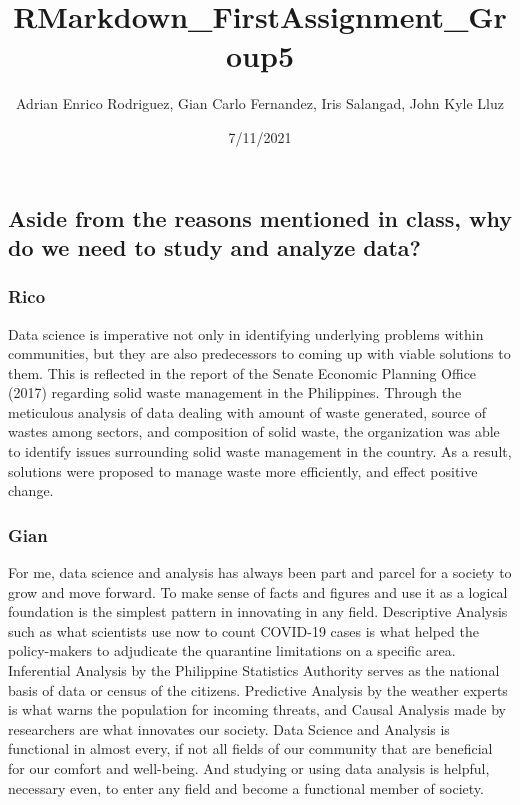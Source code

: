 \documentclass[
]{article}
\title{RMarkdown\_FirstAssignment\_Group5}
\author{Adrian Enrico Rodriguez, Gian Carlo Fernandez, Iris Salangad,
John Kyle Lluz}
\date{7/11/2021}
\begin{document}
\maketitle

\hypertarget{aside-from-the-reasons-mentioned-in-class-why-do-we-need-to-study-and-analyze-data}{%
\subsection{Aside from the reasons mentioned in class, why do we need to
study and analyze
data?}\label{aside-from-the-reasons-mentioned-in-class-why-do-we-need-to-study-and-analyze-data}}

\hypertarget{rico}{%
\subsubsection{Rico}\label{rico}}

Data science is imperative not only in identifying underlying problems
within communities, but they are also predecessors to coming up with
viable solutions to them. This is reflected in the report of the Senate
Economic Planning Office (2017) regarding solid waste management in the
Philippines. Through the meticulous analysis of data dealing with amount
of waste generated, source of wastes among sectors, and composition of
solid waste, the organization was able to identify issues surrounding
solid waste management in the country. As a result, solutions were
proposed to manage waste more efficiently, and effect positive change.

\hypertarget{gian}{%
\subsubsection{Gian}\label{gian}}

For me, data science and analysis has always been part and parcel for a
society to grow and move forward. To make sense of facts and figures and
use it as a logical foundation is the simplest pattern in innovating in
any field. Descriptive Analysis such as what scientists use now to count
COVID-19 cases is what helped the policy-makers to adjudicate the
quarantine limitations on a specific area. Inferential Analysis by the
Philippine Statistics Authority serves as the national basis of data or
census of the citizens. Predictive Analysis by the weather experts is
what warns the population for incoming threats, and Causal Analysis made
by researchers are what innovates our society. Data Science and Analysis
is functional in almost every, if not all fields of our community that
are beneficial for our comfort and well-being. And studying or using
data analysis is helpful, necessary even, to enter any field and become
a functional member of society.
\end{document}

